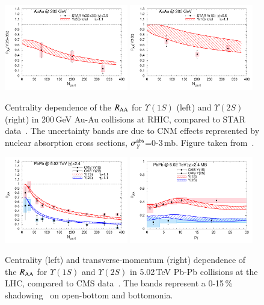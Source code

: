 {\begin{figure}[t]
\includegraphics[width=0.48\textwidth]{Figures/fig1_rapp.pdf}
\includegraphics[width=0.48\textwidth]{Figures/fig2_rapp.pdf}
\caption{Centrality dependence of the $R_{\rm AA}$ for
$\Upsilon(1S)$ (left) and $\Upsilon(2S)$ (right)
in 200\,GeV Au-Au collisions at RHIC, compared to
STAR data~\cite{Ye:2017qmstar}. The uncertainty bands are due to CNM effects represented by nuclear absorption cross sections, $\sigma_Y^{\rm abs}$=0-3\,mb. Figure taken from~\cite{rappqm17}.}
\label{fig_star}
\end{figure}
\begin{figure}[t]
\includegraphics[width=0.48\textwidth]{Figures/fig3_rapp.pdf}
\includegraphics[width=0.48\textwidth]{Figures/fig4_rapp.pdf}
\caption{Centrality (left) and transverse-momentum (right) dependence of the $R_{\rm AA}$ for $\Upsilon(1S)$ and $\Upsilon(2S)$ in 5.02\,TeV Pb-Pb collisions at the LHC, compared to CMS data~\cite{Flores:2017qmcms}. The bands represent a 0-15\,\% shadowing~\cite{Eskola:2009uj} on open-bottom and bottomonia.}
\label{fig_cms}
\end{figure}

}
